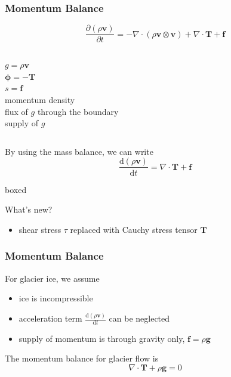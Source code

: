 \documentclass[hide notes,intlimits]{beamer}
\begin{document}
\begin{frame}
  \frametitle{Momentum Balance}
  \begin{equation}
    \frac{\partial \left(\rho \mathbf{v}\right)}{\partial t}  = -\nabla \cdot \left(\rho \mathbf{v}\otimes\mathbf{v}\right) + \nabla \cdot \mathbf{T} + \mathbf{f}
  \end{equation}
  \begin{columns}
    \column[C]{2cm}
    $g = \rho \mathbf{v}$ \\
    $\boldsymbol{\phi} = - \mathbf{T} $ \\
    $s = \mathbf{f}$ \\
    \column[C]{6cm}
      momentum density \\
      flux of $g$ through the boundary \\
      supply of $g$
    \end{columns}
    By using the mass balance, we can write
    \begin{equation}
      \frac{\text{d}\left(\rho\mathbf{v}\right)}{\text{d} t} = \nabla \cdot \mathbf{T} + \mathbf{f}
    \end{equation}
   \begin{beamercolorbox}[rounded=true,shadow=true]{boxed}
     \begin{block}{What's new?}
       \begin{itemize}
       \item shear stress $\tau$ replaced with Cauchy stress tensor $\mathbf{T}$
       \end{itemize}
     \end{block}
   \end{beamercolorbox}
 \end{frame}
  

\begin{frame}
  \frametitle{Momentum Balance}
  For glacier ice, we assume
  \begin{itemize}
  \item ice is incompressible
  \item acceleration term $\frac{\text{d}\left(\rho\mathbf{v}\right)}{\text{d} t}$ can be neglected
  \item supply of momentum is through gravity only, $\mathbf{f} = \rho \mathbf{g}$
  \end{itemize}
  \vspace{1em}
  The momentum balance for glacier flow is
  \begin{equation}
    \nabla \cdot \mathbf{T} + \rho \mathbf{g} = 0
  \end{equation}
\end{frame}
\end{document}
